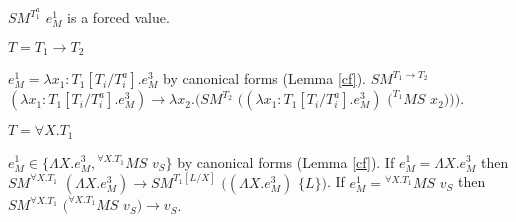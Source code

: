\begin{case}
\begin{subcase}
$SM^{T_{1}^{a}}$ $e_{M}^{1}$ is a forced value.

\end{subcase}

\begin{subcase}

$T=T_{1}\rightarrow T_{2}$

$e_{M}^{1}=\lambda x_{1}:T_{1}[T_{i}/T_{i}^{a}].e_{M}^{3}$ by canonical forms (Lemma \ref{cf}).  $SM^{T_{1}\rightarrow T_{2}}$ $(\lambda x_{1}:T_{1}[T_{i}/T_{i}^{a}].e_{M}^{3})\rightarrow\lambda x_{2}.(SM^{T_{2}}$ $((\lambda x_{1}:T_{1}[T_{i}/T_{i}^{a}].e_{M}^{3})$ $(^{T_{1}}MS$ $x_{2})))$.

\end{subcase}

\begin{subcase}

$T=\forall X.T_{1}$

$e_{M}^{1}\in\lbrace\Lambda X.e_{M}^{3},{^{\forall X.T_{1}}M}S$ $v_{S}\rbrace$ by canonical forms (Lemma \ref{cf}).  If $e_{M}^{1}=\Lambda X.e_{M}^{3}$ then $SM^{\forall X.T_{1}}$ $(\Lambda X.e_{M}^{3})\rightarrow SM^{T_{1}[L/X]}$ $((\Lambda X.e_{M}^{3})$ $\lbrace L\rbrace)$.  If $e_{M}^{1}={^{\forall X.T_{1}}M}S$ $v_{S}$ then $SM^{\forall X.T_{1}}$ $(^{\forall X.T_{1}}MS$ $v_{S})\rightarrow v_{S}$.

\end{subcase}

\end{case}